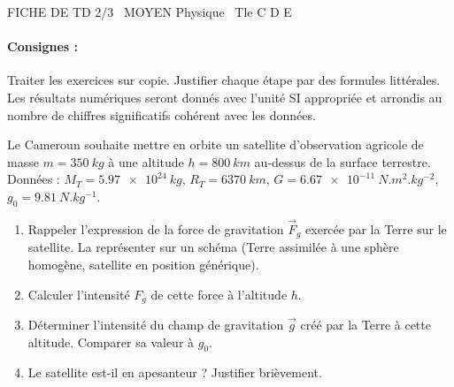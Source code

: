 \documentclass[11pt]{article}
\begin{document}
\begin{tcolorbox}[enhanced,colback=popink,colframe=popink,arc=10pt,boxrule=0pt,left=12pt,right=12pt,top=9pt,bottom=9pt]
{\color{white}\popxbold\small FICHE DE TD 2/3 \textbullet\ MOYEN \hfill Physique \textbullet\ Tle C D E\par}
\end{tcolorbox}
\vspace{4pt}
\paragraph{Consignes :} Traiter les exercices sur copie. Justifier chaque étape par des formules littérales. Les résultats numériques seront donnés avec l'unité SI appropriée et arrondis au nombre de chiffres significatifs cohérent avec les données.

\begin{exercice}
Le Cameroun souhaite mettre en orbite un satellite d'observation agricole de masse $m = \SI{350}{kg}$ à une altitude $h = \SI{800}{km}$ au-dessus de la surface terrestre.
Données : $M_T = \SI{5,97e24}{kg}$, $R_T = \SI{6370}{km}$, $G = \SI{6,67e-11}{N.m^2.kg^{-2}}$, $g_0 = \SI{9,81}{N.kg^{-1}}$.
\begin{enumerate}
    \item Rappeler l'expression de la force de gravitation $\vec{F}_g$ exercée par la Terre sur le satellite. La représenter sur un schéma (Terre assimilée à une sphère homogène, satellite en position générique).
    \item Calculer l'intensité $F_g$ de cette force à l'altitude $h$.
    \item Déterminer l'intensité du champ de gravitation $\vec{g}$ créé par la Terre à cette altitude. Comparer sa valeur à $g_0$.
    \item Le satellite est-il en apesanteur ? Justifier brièvement.
\end{enumerate}
\end{exercice}
\end{document}
